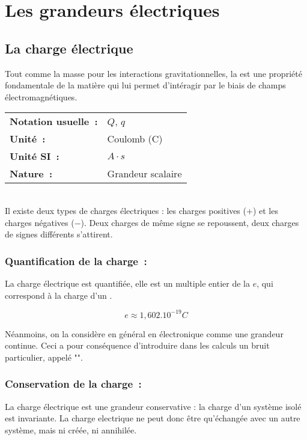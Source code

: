 \chapter{Les grandeurs électriques}

\section{La charge électrique}

Tout comme la masse pour les interactions gravitationnelles, la  est une propriété fondamentale de la matière qui lui permet d'intéragir par le biais de champs électromagnétiques. \\

\begin{tabular}{ll}
\textbf{Notation usuelle~:} & $Q$, $q$ \\
	\textbf{Unité~:} & Coulomb (C) \\
\textbf{Unité SI~:} & $A \cdot s $ \\
\textbf{Nature~:} & Grandeur scalaire \\
\end{tabular} \\

Il existe deux types de charges électriques : les charges positives ($+$) et les charges négatives ($-$). Deux charges de même signe se repoussent, deux charges de signes différents s'attirent.

\subsection*{ Quantification de la charge~: }

La charge électrique est quantifiée, elle est un multiple entier de la  $e$, qui correspond à la charge d'un . 

$$e \approx 1,602.10^{-19} C$$

Néanmoins, on la considère en général en électronique comme une grandeur continue. Ceci a pour conséquence d'introduire dans les calculs un bruit particulier, appelé "". 

\subsection*{ Conservation de la charge~: }

La charge électrique est une grandeur conservative : la charge d'un système isolé est invariante. La charge electrique ne peut donc être qu'échangée avec un autre système, mais ni créée, ni annihilée.


